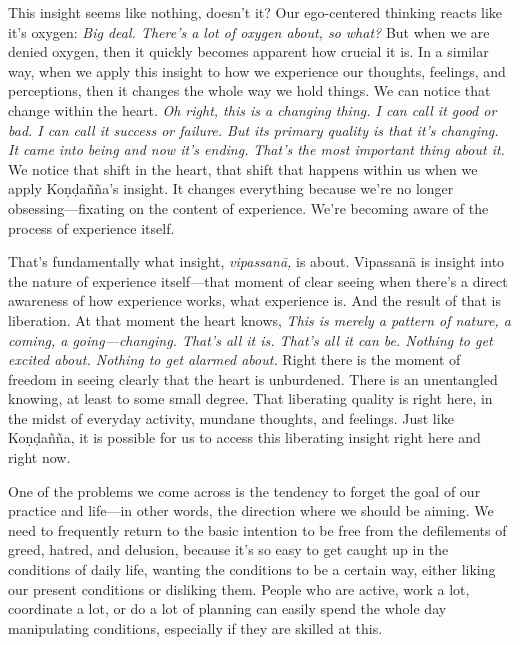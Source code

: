This insight seems like nothing, doesn't it? Our ego-centered thinking 
reacts like it's oxygen: \emph{Big deal. There's a lot of oxygen about, 
so what?} But when we are denied oxygen, then it quickly becomes 
apparent how crucial it is. In a similar way, when we apply this 
insight to how we experience our thoughts, feelings, and perceptions, 
then it changes the whole way we hold things. We can notice that change 
within the heart. \emph{Oh right, this is a changing thing. I can call 
it good or bad. I can call it success or failure. But its primary 
quality is that it's changing. It came into being and now it's ending.} 
\emph{That's the most important thing about it.} We notice that shift 
in the heart, that shift that happens within us when we apply 
Koṇḍañña's insight. It changes everything because we're no longer 
obsessing---fixating on the content of experience. We're becoming aware 
of the process of experience itself.

That's fundamentally what insight, \emph{vipassanā,} is about. 
Vipassanā is insight into the nature of experience itself---that 
moment of clear seeing when there's a direct awareness of how 
experience works, what experience is. And the result of that is 
liberation. At that moment the heart knows, \emph{This is merely a 
pattern of nature, a coming, a going---changing. That's all it is. 
That's all it can be. Nothing to get excited about. Nothing to get 
alarmed about.} Right there is the moment of freedom in seeing clearly 
that the heart is unburdened. There is an unentangled knowing, at least 
to some small degree. That liberating quality is right here, in the 
midst of everyday activity, mundane thoughts, and feelings. Just like 
Koṇḍañña, it is possible for us to access this liberating insight 
right here and right now.


One of the problems we come across is the tendency to forget the goal 
of our practice and life---in other words, the direction where we 
should be aiming. We need to frequently return to the basic intention 
to be free from the defilements of greed, hatred, and delusion, because 
it's so easy to get caught up in the conditions of daily life, wanting 
the conditions to be a certain way, either liking our present 
conditions or disliking them. People who are active, work a lot, 
coordinate a lot, or do a lot of planning can easily spend the whole 
day manipulating conditions, especially if they are skilled at this.

